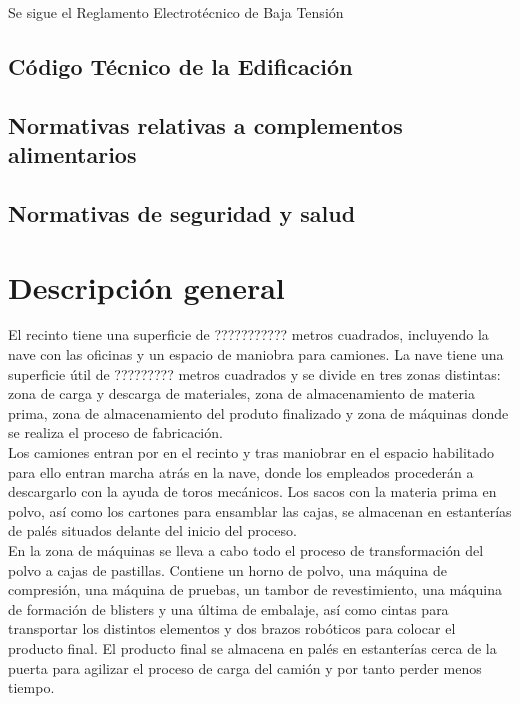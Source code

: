 Se sigue el Reglamento Electrotécnico de Baja Tensión

\subsection{Código Técnico de la Edificación}

\subsection{Normativas relativas a complementos alimentarios}

\subsection{Normativas de seguridad y salud}


\section{Descripción general}
 
El recinto tiene una superficie de ??????????? metros cuadrados, incluyendo la nave con las oficinas y un espacio de maniobra para camiones.
La nave tiene una superficie útil de ????????? metros cuadrados y se divide en tres zonas distintas: zona de carga y descarga de materiales, zona de almacenamiento de materia prima, zona de almacenamiento del produto finalizado y zona de máquinas donde se realiza el proceso de fabricación.
\\

Los camiones entran por en el recinto y tras maniobrar en el espacio habilitado para ello entran marcha atrás en la nave, donde los empleados procederán a descargarlo con la ayuda de toros mecánicos. Los sacos con la materia prima en polvo, así como los cartones para ensamblar las cajas, se almacenan en estanterías de palés situados delante del inicio del proceso. 
\\

En la zona de máquinas se lleva a cabo todo el proceso de transformación del polvo a cajas de pastillas. Contiene un horno de polvo, una máquina de compresión, una máquina de pruebas, un tambor de revestimiento, una máquina de formación de blisters y una última de embalaje, así como cintas para transportar los distintos elementos y dos brazos robóticos para colocar el producto final. El producto final se almacena en palés en estanterías cerca de la puerta para agilizar el proceso de carga del camión y por tanto perder menos tiempo.
\\


